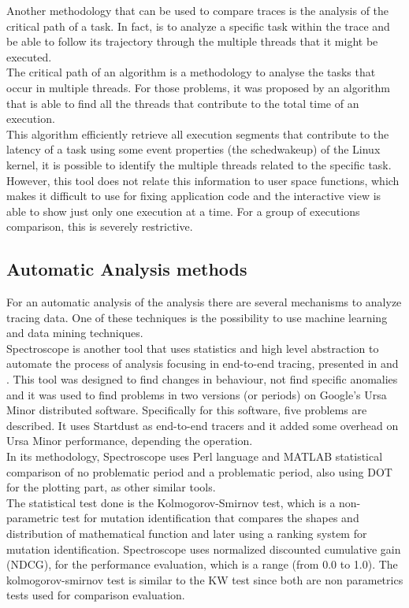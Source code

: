 Another methodology that can be used to compare traces is the analysis of the critical path of a task. In fact, is to analyze a specific task within the trace and be able to follow its trajectory through the multiple threads that it might be executed.\\
The critical path of an algorithm is a methodology to analyse the tasks that occur in multiple threads. For those problems, it was proposed by \cite{francis_phd} an algorithm that is able to find all the threads that contribute to the total time of an execution. \\
This algorithm efficiently retrieve all execution segments that contribute to the latency of a task using some event properties (the sched\textunderscore wakeup) of the Linux kernel, it is possible to identify the multiple threads related to the specific task. However, this tool does not relate this information to user space functions, which makes it difficult to use for fixing application code and the interactive view is able to show just only one execution at a time. For a group of executions comparison, this is severely restrictive.\\
\subsection{Automatic Analysis methods}
For an automatic analysis of the analysis there are several mechanisms to analyze tracing data. One of these techniques is the possibility to use machine learning and data mining techniques.\\
Spectroscope is another tool that uses statistics and high level abstraction to automate the process of analysis focusing in end-to-end tracing, presented in \cite{categorizing_system_behaviour_raja} and \cite{Sambasivan2011DPC19724571972463}. This tool was designed to find changes in behaviour, not find specific anomalies and it was used to find problems in two versions (or periods) on Google's Ursa Minor distributed software. Specifically for this software, five problems are described. It uses Startdust as end-to-end tracers and it added some overhead on Ursa Minor performance, depending the operation. \\
In its methodology, Spectroscope uses Perl language and MATLAB statistical comparison of no problematic period and a problematic period, also using DOT for the plotting part, as other similar tools.\\
The statistical test done is the Kolmogorov-Smirnov test,  which is a non-parametric test for mutation identification that compares the shapes and distribution of mathematical function and later using a ranking system for mutation identification. Spectroscope uses normalized discounted cumulative gain (NDCG), for the performance evaluation, which is a range (from 0.0 to 1.0). The kolmogorov-smirnov test is similar to the KW test since both are non parametrics tests used for comparison evaluation.\\
